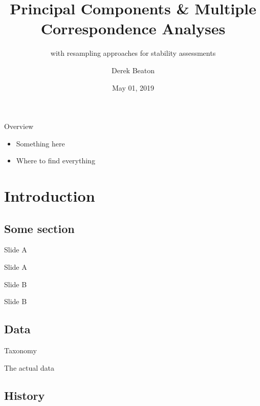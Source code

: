 \documentclass[
  ignorenonframetext,
]{beamer}
\title{Principal Components \& Multiple Correspondence Analyses}
\subtitle{with resampling approaches for stability assessments}
\author{Derek Beaton}
\date{May 01, 2019}
\institute{RRI RTC}
\providecommand{\tightlist}{%
  \setlength{\itemsep}{0pt}\setlength{\parskip}{0pt}}
\begin{document}
\frame{\titlepage}

\begin{frame}{Overview}
\protect\hypertarget{overview}{}

\begin{itemize}[<+->]
\tightlist
\item
  Something here
\item
  Where to find everything
\end{itemize}

\end{frame}

\hypertarget{introduction}{%
\section{Introduction}\label{introduction}}

\hypertarget{some-section}{%
\subsection{Some section}\label{some-section}}

\begin{frame}{Slide A}
\protect\hypertarget{slide-a}{}

Slide A

\end{frame}

\begin{frame}{Slide B}
\protect\hypertarget{slide-b}{}

Slide B

\end{frame}

\hypertarget{data}{%
\subsection{Data}\label{data}}

\begin{frame}{Taxonomy}
\protect\hypertarget{taxonomy}{}

\end{frame}

\begin{frame}{The actual data}
\protect\hypertarget{the-actual-data}{}

\end{frame}

\hypertarget{history}{%
\subsection{History}\label{history}}
\end{document}
